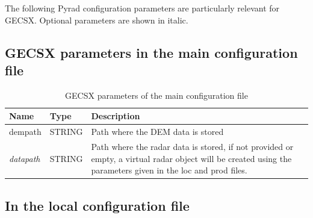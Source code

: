 \documentclass[a4paper,11pt,pdftex,twoside]{scrartcl}
\renewcommand{\bf}{\normalfont \bfseries}
\begin{document}
{{{The following Pyrad configuration parameters are particularly relevant for GECSX. Optional parameters are shown in italic.

\subsection{GECSX parameters in the main configuration file}

\begin{table}[h!]
\caption{GECSX parameters of the main configuration file}
\begin{tabular}{p{}p{}p{}}
\bf{Name}          & \bf{Type} & \bf{Description}\\
\hline
dempath & STRING & Path where the DEM data is stored\\
\textit{datapath} & STRING & Path where the radar data is stored, if not provided or empty, a virtual radar object will be created using the parameters given in the loc and prod files.\\
\end{tabular}
\end{table}                                 
    
    \newpage
\subsection{In the local configuration file}

}}}
\end{document}
